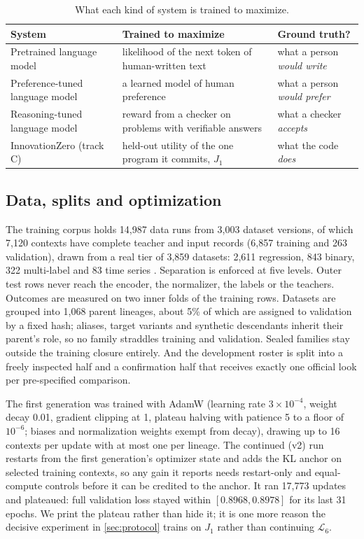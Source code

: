 \begin{table}[h]
\caption{What each kind of system is trained to maximize.}
\label{tab:objectives}
\centering\tablesf
\begin{tabularx}{\linewidth}{@{}lLl@{}}
\toprule
System & Trained to maximize & Ground truth? \\
\midrule
Pretrained language model & likelihood of the next token of human-written text & what a person \emph{would write} \\
Preference-tuned language model & a learned model of human preference & what a person \emph{would prefer} \\
Reasoning-tuned language model & reward from a checker on problems with verifiable answers & what a checker \emph{accepts} \\
InnovationZero (track C) & held-out utility of the one program it commits, $J_1$ & what the code \emph{does} \\
\bottomrule
\end{tabularx}
\end{table}

\subsection{Data, splits and optimization}

The training corpus holds 14,987 data runs from 3,003 dataset versions, of which 7,120 contexts have
complete teacher and input records (6,857 training and 263 validation), drawn from a real tier of
3,859 datasets: 2,611 regression, 843 binary, 322 multi-label and 83 time series
\citep{jopedime2026writeup}. Separation is enforced at five levels. Outer test rows never reach the
encoder, the normalizer, the labels or the teachers. Outcomes are measured on two inner folds of the
training rows. Datasets are grouped into 1,068 parent lineages, about 5\% of which are assigned to
validation by a fixed hash; aliases, target variants and synthetic descendants inherit their
parent's role, so no family straddles training and validation. Sealed families stay outside the
training closure entirely. And the development roster is split into a freely inspected half and a
confirmation half that receives exactly one official look per pre-specified comparison.

The first generation was trained with AdamW (learning rate $3\times10^{-4}$, weight decay 0.01,
gradient clipping at 1, plateau halving with patience 5 to a floor of $10^{-6}$; biases and
normalization weights exempt from decay), drawing up to 16 contexts per update with at most one per
lineage. The continued (v2) run restarts from the first generation's optimizer state and adds the KL
anchor on selected training contexts, so any gain it reports needs restart-only and equal-compute
controls before it can be credited to the anchor. It ran 17,773 updates and plateaued: full
validation loss stayed within $[0.8968, 0.8978]$ for its last 31 epochs. We print the plateau
rather than hide it; it is one more reason the decisive experiment in \cref{sec:protocol} trains on
$J_1$ rather than continuing $\mathcal{L}_6$.
